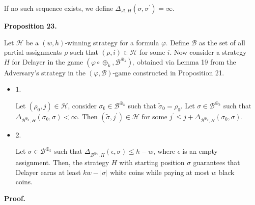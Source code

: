 If no such sequence exists, we define $\Delta_{\mathcal{A},H}(\sigma,\sigma^{\prime})=\infty$.\par




\par\medskip\noindent\textbf{
Proposition 23.
}\par



Let $\mathcal{H}$ be a $(w,h)$-winning strategy for a formula $\varphi$.
Define $\mathcal{B}$ as the set of all partial assignments $\rho$ such that $(\rho,i)\in\mathcal{H}$ for some $i$.
Now consider a strategy $H$ for Delayer in the game $(\varphi\circ\oplus_{k},\mathcal{B}^{\oplus_{k}})$, obtained via Lemma 19 from the Adversary’s strategy in the $(\varphi,\mathcal{B})$-game constructed in Proposition 21.\par


\begin{itemize}


\item 
1. 


Let $(\rho_{0},j)\in\mathcal{H}$, consider $\sigma_{0}\in\mathcal{B}^{\oplus_{k}}$ such that
$\tilde{\sigma}_{0}=\rho_{0}$. Let $\sigma\in\mathcal{B}^{\oplus_{k}}$ such that
$\Delta_{\mathcal{B}^{\oplus_{k}},H}(\sigma_{0},\sigma)<\infty$.
Then $(\tilde{\sigma},j^{\prime})\in\mathcal{H}$ for some
$j^{\prime}\leq j+\Delta_{\mathcal{B}^{\oplus_{k}},H}(\sigma_{0},\sigma)$.\par





\item 
2. 


Let $\sigma\in\mathcal{B}^{\oplus_{k}}$ such that $\Delta_{\mathcal{B}^{\oplus_{k}},H}(\epsilon,\sigma)\leq h-w$, where $\epsilon$ is an empty assignment. Then, the strategy $H$ with starting position $\sigma$ guarantees that Delayer earns at least $kw-|\sigma|$ white coins while paying at most $w$ black coins.\par





\end{itemize}



\par\medskip\noindent\textbf{Proof.}\par


